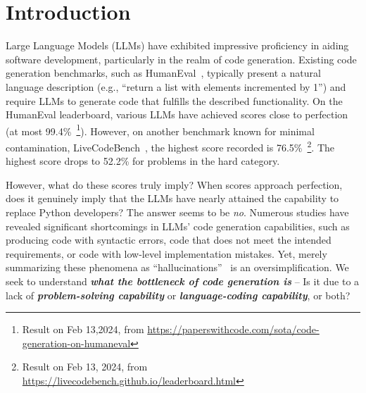 \section{Introduction}\label{sec:introduction}




Large Language Models (LLMs) have exhibited impressive proficiency in aiding software development, particularly in the realm of code generation. Existing code generation benchmarks, such as HumanEval~\cite{humaneval}, typically present a natural language description (e.g., ``return a list with elements incremented by 1'') and require LLMs to generate code that fulfills the described functionality. On the HumanEval leaderboard, various LLMs have achieved scores close to perfection (at most 99.4\%~\footnote{Result on Feb 13,2024, from \url{https://paperswithcode.com/sota/code-generation-on-humaneval}}). However, on another benchmark known for minimal contamination, LiveCodeBench~\cite{livecb}, the highest score recorded is 76.5\%~\footnote{Result on Feb 13, 2024, from \url{https://livecodebench.github.io/leaderboard.html}}. The highest score drops to 52.2\% for problems in the hard category.

However, what do these scores truly imply? When scores approach perfection, does it genuinely imply that the LLMs have nearly attained the capability to replace Python developers? The answer seems to be \textit{no}. Numerous studies have revealed significant shortcomings in LLMs' code generation capabilities, such as producing code with syntactic errors, code that does not meet the intended requirements, or code with low-level implementation mistakes. Yet, merely summarizing these phenomena as ``hallucinations''~\cite{li2023halueval,xu2024hallucination,zhang2023siren,dhuliawala2023chain, issta25llmhal} is an oversimplification. We seek to understand \textbf{\textit{what the bottleneck of code generation is}} -- Is it due to a lack of \textbf{\textit{problem-solving capability}} or \textbf{\textit{language-coding capability}}, or both?



